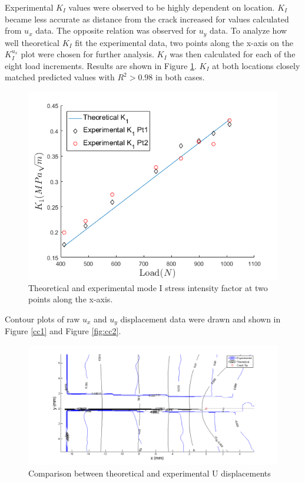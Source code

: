 \documentclass[12pt]{article}
\begin{document}
Experimental $K_I$ values were observed to be highly dependent on location. $K_I$ became less accurate as distance from the crack increased for values calculated from $u_x$ data. The opposite relation was observed for $u_y$ data. To analyze how well theoretical $K_I$ fit the experimental data, two points along the x-axis on the $K_I^{u_x}$ plot were chosen for further analysis. $K_I$ was then calculated for each of the eight load increments. Results are shown in Figure \ref{fig:K1}. $K_I$ at both locations closely matched predicted values with $R^2>0.98$ in both cases. 



\begin{figure}[H]
	\begin{center}
		
		\includegraphics[width=1\textwidth]{K_1_Comparisons.png}
		\caption{Theoretical and experimental mode I stress intensity factor at two points along the x-axis.}
		\label{fig:K1}
	\end{center}
\end{figure}

Contour plots of raw $u_x$ and $u_y$ displacement data were drawn and shown in Figure \ref{cc1} and Figure \ref{fig:cc2}. 

\begin{figure}[H]
	\centering
	\includegraphics[width=1\textwidth]{contourCompare_8_1.png}
	\caption{Comparison between theoretical and experimental U displacements}
	\label{fig:cc1}
\end{figure}
\end{document}
